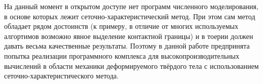 На данный момент в открытом доступе нет программ численного моделирования, в
основе которых лежит сеточно-характеристический метод. При этом сам метод 
обладает рядом достоинств (к примеру, в отличие от многих используемых алгортимов
возможно явное выделение контактной границы) и в тоерии должен давать весьма
качественные результаты. Поэтому в данной работе предпринята попытка реализации
программного комплекса для высокопроизводительных вычислений в области механики
деформируемого твёрдого тела с использованием сеточно-характеристического
метода.
